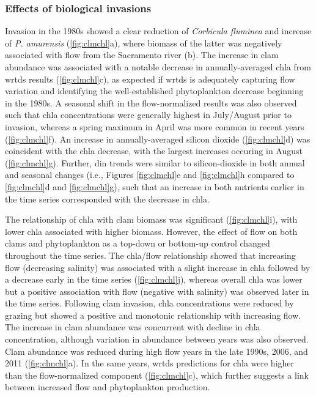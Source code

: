 \documentclass[letterpaper,12pt,oneside]{article}\usepackage[]{graphicx}\usepackage[]{color}
\begin{document}
\subsubsection{Effects of biological invasions}

Invasion in the 1980s showed a clear reduction of \textit{Corbicula fluminea} and increase of \textit{P. amurensis} (\cref{fig:clmchl}a), where biomass of the latter was negatively associated with flow from the Sacramento river (b).  The increase in clam abundance was associated with a notable decrease in annually-averaged \ac{chla} from \ac{wrtds} results (\cref{fig:clmchl}c), as expected if \ac{wrtds} is adequately capturing flow variation and identifying the well-established phytoplankton decrease beginning in the 1980s.  A seasonal shift in the flow-normalized results was also observed such that \ac{chla} concentrations were generally highest in July/August prior to invasion, whereas a spring maximum in April was more common in recent years (\cref{fig:clmchl}f).  An increase in annually-averaged silicon dioxide (\cref{fig:clmchl}d) was coincident with the \ac{chla} decrease, with the largest increases occuring in August (\cref{fig:clmchl}g).   Further, \ac{din} trends were similar to silicon-dioxide in both annual and seasonal changes (i.e., Figures \ref{fig:clmchl}e and \ref{fig:clmchl}h compared to \ref{fig:clmchl}d and \ref{fig:clmchl}g), such that an increase in both nutrients earlier in the time series corresponded with the decrease in \ac{chla}.

The relationship of \ac{chla} with clam biomass was significant (\cref{fig:clmchl}i), with lower \ac{chla} associated with higher biomass. However, the effect of flow on both clams and phytoplankton as a top-down or bottom-up control changed throughout the time series.  The \ac{chla}/flow relationship showed that increasing flow (decreasing salinity) was associated with a slight increase in \ac{chla} followed by a decrease early in the time series (\cref{fig:clmchl}j), whereas overall \ac{chla} was lower but a positive association with flow (negative with salinity) was observed later in the time series. Following clam invasion, \ac{chla} concentrations were reduced by grazing but showed a positive and monotonic relationship with increasing flow. The increase in clam abundance was concurrent with decline in \ac{chla} concentration, although variation in abundance between years was also observed.  Clam abundance was reduced during high flow years in the late 1990s, 2006, and 2011 (\ref{fig:clmchl}a). In the same years, \ac{wrtds} predictions for \ac{chla} were higher than the flow-normalized component (\cref{fig:clmchl}c), which further suggests a link between increased flow and phytoplankton production.
\end{document}

